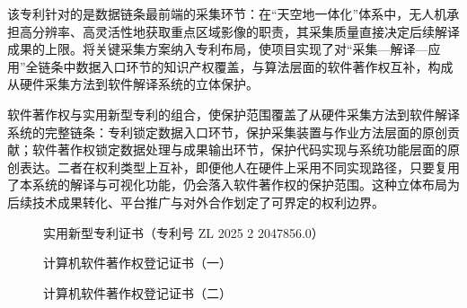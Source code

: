 该专利针对的是数据链条最前端的采集环节：在“天空地一体化”体系中，无人机承担高分辨率、高灵活性地获取重点区域影像的职责，其采集质量直接决定后续解译成果的上限。将关键采集方案纳入专利布局，使项目实现了对“采集—解译—应用”全链条中数据入口环节的知识产权覆盖，与算法层面的软件著作权互补，构成从硬件采集方法到软件解译系统的立体保护。

软件著作权与实用新型专利的组合，使保护范围覆盖了从硬件采集方法到软件解译系统的完整链条：专利锁定数据入口环节，保护采集装置与作业方法层面的原创贡献；软件著作权锁定数据处理与成果输出环节，保护代码实现与系统功能层面的原创表达。二者在权利类型上互补，即便他人在硬件上采用不同实现路径，只要复用了本系统的解译与可视化功能，仍会落入软件著作权的保护范围。这种立体布局为后续技术成果转化、平台推广与对外合作划定了可界定的权利边界。

\begin{figure}[htbp]
    \centering
    \caption{实用新型专利证书（专利号 ZL 2025 2 2047856.0）}
    \label{fig:10}
\end{figure}

\begin{figure}[htbp]
    \centering
    \caption{计算机软件著作权登记证书（一）}
    \label{fig:11}
\end{figure}

\begin{figure}[htbp]
    \centering
    \caption{计算机软件著作权登记证书（二）}
    \label{fig:12}
\end{figure}
